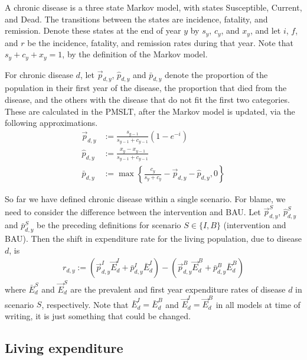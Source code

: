 \documentclass[]{article}
\begin{document}
A chronic disease is a three state Markov model, with states Susceptible, Current, and Dead. The transitions between the states are incidence, fatality, and remission. Denote these states at the end of year $y$ by $s_y$, $c_y$, and $x_y$, and let $i$, $f$, and $r$ be the incidence, fatality, and remission rates during that year. Note that $s_y + c_y + x_y = 1$, by the definition of the Markov model.

For chronic disease $d$, let $\vec{p}_{d, y}$, $\widehat{p}_{d, y}$ and $\bar{p}_{d, y}$ denote the proportion of the population in their first year of the disease, the proportion that died from the disease, and the others with the disease that do not fit the first two categories. These are calculated in the PMSLT, after the Markov model is updated, via the following approximations.
\begin{align*}
	\vec{p}_{d, y} &:= \frac{s_{y - 1}}{s_{y - 1} + c_{y - 1}}(1 - e^{-i}) \\
	\widehat{p}_{d, y} &:= \frac{x_y - x_{y - 1}}{s_{y - 1} + c_{y - 1}} \\
	\bar{p}_{d, y} &:= \max\left\{\frac{c_y}{s_y + c_y} - \vec{p}_{d, y} - \widehat{p}_{d, y}, 0 \right\}
\end{align*}

So far we have defined chronic disease within a single scenario. For blame, we need to consider the difference between the intervention and BAU. Let $\vec{p}^S_{d, y}$, $\widehat{p}^S_{d, y}$ and $\bar{p}^S_{d, y}$ be the preceding definitions for scenario $S \in \{I, B\}$ (intervention and BAU). Then the shift in expenditure rate for the living population, due to disease $d$, is
\begin{align*}
	r_{d, y} := 
	\left(\vec{p}^I_{d, y}\vec{E}^I_{d} + \bar{p}^I_{d, y}\bar{E}^I_{d}\right) - \left(\vec{p}^B_{d, y}\vec{E}^B_{d} + \bar{p}^B_{d, y}\bar{E}^B_{d}\right)
\end{align*}
where $\bar{E}^S_d$ and $\vec{E}^S_d$ are the prevalent and first year expenditure rates of disease $d$ in scenario $S$, respectively. Note that $\bar{E}^I_d = \bar{E}^B_d$ and $\vec{E}^I_d = \vec{E}^B_d$ in all models at time of writing, it is just something that could be changed.

\subsection{Living expenditure}
\end{document}
